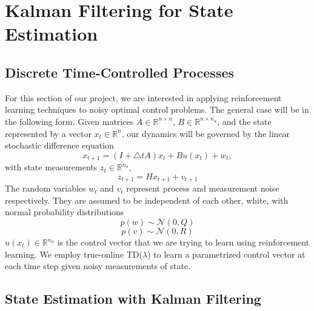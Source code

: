 \documentclass{article}
\begin{document}
\section{Kalman Filtering for State Estimation}
\subsection{Discrete Time-Controlled Processes}

For this section of our project, we are interested in applying reinforcement learning techniques to noisy optimal control problems. The general case will be in the following form. Given matrices $A \in \mathbb{R}^{n \times n}$, $B \in \mathbb{R}^{n \times n_u}$, and the state represented by a vector $x_t \in \mathbb R^n$, our dynamics will be governed by the linear stochastic difference equation
\begin{equation}
    x_{t+1} = (I + \triangle t A) x_t + Bu(x_t) + w_t,
    \label{eq:dynamical}
\end{equation}
with state measurements $z_t \in \mathbb{R}^{n_o}$, 
\[
	z_{t+1} = H x_{t+1} + v_{t+1}
\]
The random variables $w_t$ and $v_t$ represent process and measurement noise respectively. They are assumed to be independent of each other, white, with normal probability distributions
\[ 
p(w) \sim \mathcal{N}(0, Q)
\]
\[
p(v) \sim \mathcal{N}(0, R)
\]
$u(x_t) \in \mathbb{R}^{n_u}$ is the control vector that we are trying to learn using reinforcement learning. We employ true-online TD($\lambda$) to learn a parametrized control vector at each time step given noisy measurements of state.

\subsection{State Estimation with Kalman Filtering}
\end{document}
